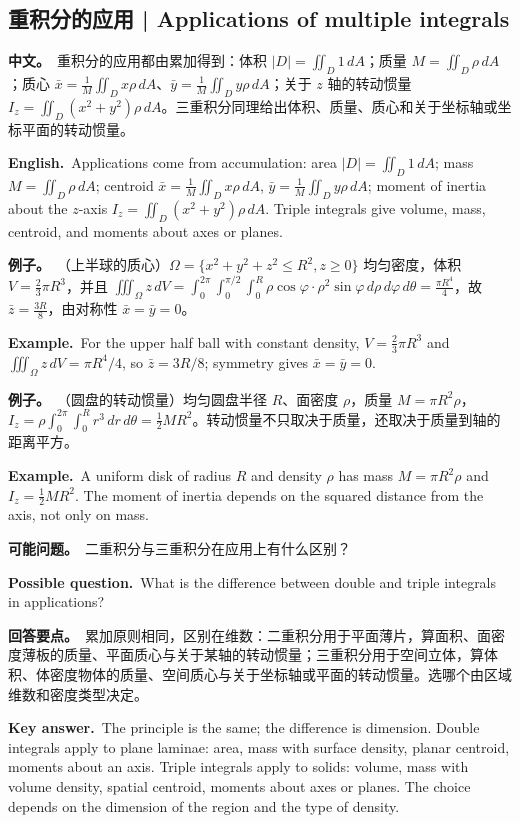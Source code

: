 \documentclass[UTF8,11pt,a4paper]{ctexart}
\newcommand{\BOTH}[2]{\par\noindent\textbf{中文。}\ #1\par\noindent\textbf{English.}\ #2\par}
\newcommand{\EX}[2]{\par\noindent\textbf{例子。}\ #1\par\noindent\textbf{Example.}\ #2\par}
\newcommand{\ASK}[4]{\begin{samepage}\par\noindent\textbf{可能问题。}\ #1\par\noindent\textbf{Possible question.}\ #2\par\noindent\textbf{回答要点。}\ #3\par\noindent\textbf{Key answer.}\ #4\medskip\end{samepage}}
\begin{document}
\subsection{重积分的应用 | Applications of multiple integrals}
\BOTH{重积分的应用都由累加得到：体积 $|D|=\iint_D1\,dA$；质量 $M=\iint_D\rho\,dA$；质心 $\bar x=\frac1M\iint_Dx\rho\,dA$、$\bar y=\frac1M\iint_Dy\rho\,dA$；关于 $z$ 轴的转动惯量 $I_z=\iint_D(x^2+y^2)\rho\,dA$。三重积分同理给出体积、质量、质心和关于坐标轴或坐标平面的转动惯量。}{Applications come from accumulation: area $|D|=\iint_D1\,dA$; mass $M=\iint_D\rho\,dA$; centroid $\bar x=\frac1M\iint_Dx\rho\,dA$, $\bar y=\frac1M\iint_Dy\rho\,dA$; moment of inertia about the $z$-axis $I_z=\iint_D(x^2+y^2)\rho\,dA$. Triple integrals give volume, mass, centroid, and moments about axes or planes.}
\EX{（上半球的质心）$\Omega=\{x^2+y^2+z^2\le R^2,z\ge0\}$ 均匀密度，体积 $V=\frac23\pi R^3$，并且 $\iiint_\Omega z\,dV=\int_0^{2\pi}\int_0^{\pi/2}\int_0^R\rho\cos\varphi\cdot\rho^2\sin\varphi\,d\rho\,d\varphi\,d\theta=\frac{\pi R^4}{4}$，故 $\bar z=\frac{3R}{8}$，由对称性 $\bar x=\bar y=0$。}{For the upper half ball with constant density, $V=\frac23\pi R^3$ and $\iiint_\Omega z\,dV=\pi R^4/4$, so $\bar z=3R/8$; symmetry gives $\bar x=\bar y=0$.}
\EX{（圆盘的转动惯量）均匀圆盘半径 $R$、面密度 $\rho$，质量 $M=\pi R^2\rho$，$I_z=\rho\int_0^{2\pi}\int_0^Rr^3\,dr\,d\theta=\frac12MR^2$。转动惯量不只取决于质量，还取决于质量到轴的距离平方。}{A uniform disk of radius $R$ and density $\rho$ has mass $M=\pi R^2\rho$ and $I_z=\frac12MR^2$. The moment of inertia depends on the squared distance from the axis, not only on mass.}
\ASK{二重积分与三重积分在应用上有什么区别？}{What is the difference between double and triple integrals in applications?}{累加原则相同，区别在维数：二重积分用于平面薄片，算面积、面密度薄板的质量、平面质心与关于某轴的转动惯量；三重积分用于空间立体，算体积、体密度物体的质量、空间质心与关于坐标轴或平面的转动惯量。选哪个由区域维数和密度类型决定。}{The principle is the same; the difference is dimension. Double integrals apply to plane laminae: area, mass with surface density, planar centroid, moments about an axis. Triple integrals apply to solids: volume, mass with volume density, spatial centroid, moments about axes or planes. The choice depends on the dimension of the region and the type of density.}
\end{document}
